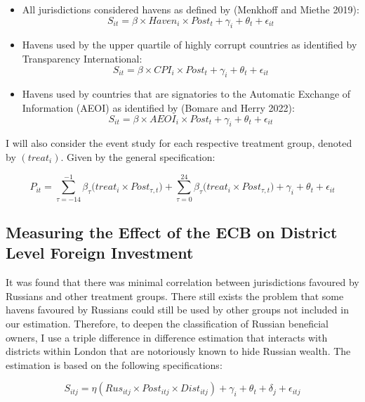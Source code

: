 \documentclass{article}
\begin{document}
\begin{itemize}
\item All jurisdictions considered havens as defined by (Menkhoff and Miethe 2019): 
\begin{equation}
S_{it} = \beta \times Haven_i \times Post_t + \gamma_i + \theta_t + \epsilon_{it}
\end{equation}

\item Havens used by the upper quartile of highly corrupt countries as identified by Transparency International:
\begin{equation}
S_{it} = \beta \times CPI_i \times Post_t + \gamma_i + \theta_t + \epsilon_{it}
\end{equation}
\item Havens used by countries that are signatories to the Automatic Exchange of Information (AEOI) as identified by (Bomare and Herry 2022):
\begin{equation}
S_{it} = \beta \times AEOI_i \times Post_t + \gamma_i + \theta_t + \epsilon_{it}
\end{equation}
\end{itemize}

I will also consider the event study for each respective treatment group, denoted by $(treat_i)$. Given by the general specification: 

\begin{equation}
P_{it} = \sum^{-1}_{\tau=-14}\beta_\tau({treat_{i}\times{Post_{\tau,t}})}+\sum^{24}_{\tau=0}\beta_\tau({treat_{i}}\times{Post_{\tau,t})} + \gamma_i + \theta_t + \epsilon_{it}
\end{equation}

\subsection{Measuring the Effect of the ECB on District Level Foreign Investment}

It was found that there was minimal correlation between jurisdictions favoured by Russians and other treatment groups. There still exists the problem that some havens favoured by Russians could still be used by other groups not included in our estimation. Therefore, to deepen the classification of Russian beneficial owners, I use a triple difference in difference estimation that interacts with districts within London that are notoriously known to hide Russian wealth. The estimation is based on the following specifications: 

\begin{equation}
S_{itj} = \eta (Rus_{itj} \times Post_{itj}\times{Dist_{itj}}) + \gamma_{i} + \theta_{t} + \delta_{j} + \epsilon_{itj}
\end{equation}
\end{document}
